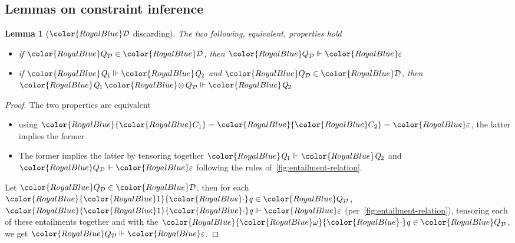 \documentclass[acmsmall,usenames,dvipsnames,natbib=false,acmthm=false,screen]{acmart}
\newcommand{\constraintcolour}{\color{RoyalBlue}}
\newcommand{\constraintfont}[1]{{\constraintcolour#1}}
\newcommand{\multiplicitycolour}{\color{RoyalBlue}}
\newcommand{\multiplicityfont}[1]{{\multiplicitycolour#1}}
\newcommand{\scale}{\constraintfont{\cdot}}
\newcommand{\constraintop}[1]{\mathop{\constraintfont{#1}}}
\newcommand{\qtensor}{\constraintop{\otimes}}
\theoremstyle{acmplain}
\newtheorem{lemma}[theorem]{Lemma}
\theoremstyle{acmdefinition}
\begin{document}
\setcounter{subsection}{5}
\subsection{Lemmas on constraint inference}
\label{sec:appendix:constraint-inference}

\begin{lemma}[$ \constraintfont{\mathcal{D} } $ discarding]
  \label{lem:dup-weakening}
  The two following, equivalent, properties hold
  \begin{itemize}
  \item if $  \constraintfont{ Q_{\mathcal{D} } }   \in  \constraintfont{\mathcal{D} } $, then $ \constraintfont{ Q_{\mathcal{D} } }   \Vdash   \constraintfont{  \mathbf{\varepsilon}  } $
  \item if $ \constraintfont{ \ottnt{Q_{{\mathrm{1}}}} }   \Vdash   \constraintfont{ \ottnt{Q_{{\mathrm{2}}}} } $ and $  \constraintfont{ Q_{\mathcal{D} } }   \in  \constraintfont{\mathcal{D} } $, then $ \constraintfont{ \ottnt{Q_{{\mathrm{1}}}}  \qtensor  Q_{\mathcal{D} } }   \Vdash   \constraintfont{ \ottnt{Q_{{\mathrm{2}}}} } $
  \end{itemize}
\end{lemma}
\begin{proof}
  The two properties are equivalent
  \begin{itemize}
  \item using $  \constraintfont{ \constraintfont{C_{{\mathrm{1}}}} }  =  \constraintfont{ \constraintfont{C_{{\mathrm{2}}}} }  =  \constraintfont{  \mathbf{\varepsilon}  }  $, the latter implies the
    former
  \item The former implies the latter by tensoring together
    $ \constraintfont{ \ottnt{Q_{{\mathrm{1}}}} }   \Vdash   \constraintfont{ \ottnt{Q_{{\mathrm{2}}}} } $ and $ \constraintfont{ Q_{\mathcal{D} } }   \Vdash   \constraintfont{  \mathbf{\varepsilon}  } $ following the rules
    of~\cref{fig:entailment-relation}.
  \end{itemize}
  Let $  \constraintfont{ Q_{\mathcal{D} } }   \in  \constraintfont{\mathcal{D} } $, then for each $  \constraintfont{   \multiplicityfont{ \ottsym{1} }  \scale \ottnt{q}  }   \in   \constraintfont{ Q_{\mathcal{D} } }  $,
  $ \constraintfont{   \multiplicityfont{ \ottsym{1} }  \scale \ottnt{q}  }   \Vdash   \constraintfont{  \mathbf{\varepsilon}  } $ (per~\cref{fig:entailment-relation}), tensoring
  each of these entailments together and with the $  \constraintfont{   \multiplicityfont{ \omega }  \scale \ottnt{q}  }   \in   \constraintfont{ Q_{\mathcal{D} } }  $, we get $ \constraintfont{ Q_{\mathcal{D} } }   \Vdash   \constraintfont{  \mathbf{\varepsilon}  } $.
\end{proof}
\end{document}
